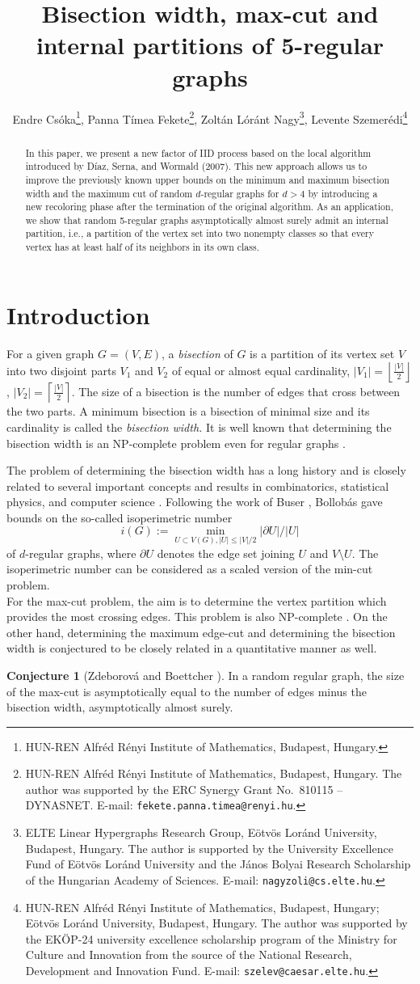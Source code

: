 \documentclass{article}
\title{Bisection width, max-cut and internal partitions of 5-regular graphs}
\author{Endre Csóka\thanks{HUN-REN Alfréd Rényi Institute of Mathematics, Budapest, Hungary. },
Panna Tímea Fekete\thanks{HUN-REN Alfréd Rényi Institute of Mathematics, Budapest, Hungary. The author was supported by the ERC Synergy Grant No.\ 810115 -- DYNASNET. E-mail: {\tt fekete.panna.timea@renyi.hu}.},
 Zolt\'an L\'or\'ant Nagy\thanks{ELTE Linear Hypergraphs  Research Group,
		E\"otv\"os Lor\'and University, Budapest, Hungary. The author is supported by the University Excellence Fund of Eötvös Loránd University and the János Bolyai Research Scholarship of the Hungarian Academy of Sciences. 	E-mail: {\tt nagyzoli@cs.elte.hu}.},
Levente Szemerédi\thanks{HUN-REN Alfréd Rényi Institute of Mathematics, Budapest, Hungary; E\"otv\"os Lor\'and University, Budapest, Hungary. The author was supported by the EKÖP-24 university excellence scholarship program of the Ministry for Culture and Innovation from the source of the National Research, Development and Innovation Fund. E-mail: {\tt szelev@caesar.elte.hu}.}}
\date{}
\theoremstyle{definition}
\newtheorem{conj}[definition]{Conjecture}
\begin{document}
\maketitle

\begin{abstract}
In this paper, we 
present a new factor of IID process based on the local algorithm introduced by Díaz, Serna, and Wormald (2007). This new approach allows us to improve the previously known upper bounds on the minimum and maximum bisection width and the maximum cut of random $d$-regular graphs for $d>4$ by introducing a new recoloring phase after the termination of the original algorithm. 
As an application, we show that random 5-regular graphs asymptotically almost surely admit an internal partition, i.e., a partition of the vertex set into two nonempty classes so that every vertex has at least half of its neighbors in its own class. 
\end{abstract}

\section{Introduction}

For a given graph $G=(V,E)$, a {\em bisection} of $G$ is a partition of its vertex set $V$ into two disjoint parts $V_1$ and $V_2$ of equal or almost equal cardinality, $|V_1|=\left\lfloor \frac{|V|}{2}\right\rfloor$, $|V_2|=\left\lceil \frac{|V|}{2}\right\rceil$. The size of a bisection is the number of edges that cross between the two parts. A minimum bisection is a bisection of minimal size and its cardinality is called the {\em bisection width.}
It is well known that determining the bisection width is an NP-complete problem even for regular graphs \cite{johnson1979computers}.

The problem of determining the bisection width has a long history and is closely related to several important concepts and results in combinatorics, statistical physics, and computer science \cite{dembo2017extremal, diaz2007bounds, lyons2017factors, montanari2004instability, zdeborova2010conjecture}.
Following the work of Buser \cite{buser1978cubic}, Bollobás \cite{bollobas1988isoperimetric} gave bounds on the so-called isoperimetric number $$i(G):= \min_{U\subset V(G), |U|\leq |V|/2} |\partial{U}|/|U|$$  of $d$-regular graphs, where $\partial{U}$ denotes the edge set joining $U$ and $V\setminus U$. 
The isoperimetric number can be considered as a scaled version of the min-cut problem.\\ For the max-cut problem, the aim is to determine the vertex partition which provides the most crossing edges. This problem is also NP-complete \cite{johnson1979computers}.
On the other hand, determining the maximum edge-cut and determining the bisection width is conjectured to be closely related in a quantitative manner as well. 
\begin{conj}[Zdeborov\'a and Boettcher \cite{zdeborova2010conjecture}] 
In a random regular graph, the
size of the max-cut is asymptotically equal to the number of edges minus the bisection width, asymptotically almost surely. 
\end{conj}
\end{document}
